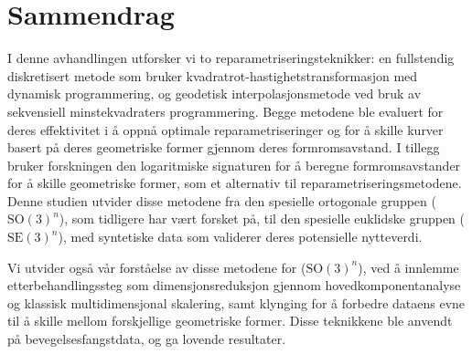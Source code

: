 \chapter*{Sammendrag}

I denne avhandlingen utforsker vi to reparametriseringsteknikker: en fullstendig diskretisert metode som bruker kvadratrot-hastighetstransformasjon med dynamisk programmering, og geodetisk interpolasjonsmetode ved bruk av sekvensiell minstekvadraters programmering. Begge metodene ble evaluert for deres effektivitet i å oppnå optimale reparametriseringer og for å skille kurver basert på deres geometriske former gjennom deres formromsavstand. I tillegg bruker forskningen den logaritmiske signaturen for å beregne formromsavstander for å skille geometriske former, som et alternativ til reparametriseringsmetodene. Denne studien utvider disse metodene fra den spesielle ortogonale gruppen (\(\mathrm{SO}(3)^n\)), som tidligere har vært forsket på, til den spesielle euklidske gruppen (\(\mathrm{SE}(3)^n\)), med syntetiske data som validerer deres potensielle nytteverdi.

Vi utvider også vår forståelse av disse metodene for (\(\mathrm{SO}(3)^n\)), ved å innlemme etterbehandlingssteg som dimensjonsreduksjon gjennom hovedkomponentanalyse og klassisk multidimensjonal skalering, samt klynging for å forbedre dataens evne til å skille mellom forskjellige geometriske former. Disse teknikkene ble anvendt på bevegelsesfangstdata, og ga lovende resultater.